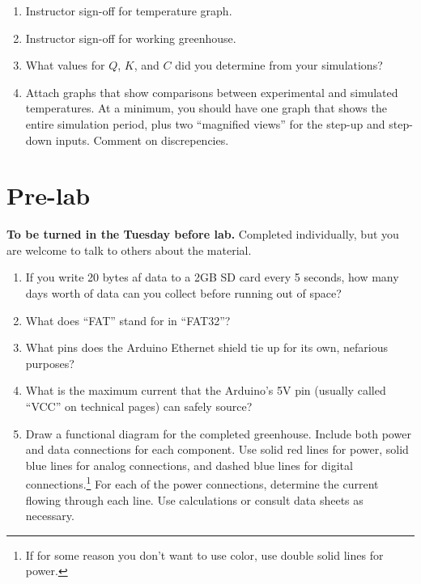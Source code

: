 \documentclass[11pt]{article} %
\begin{document}
\begin{enumerate}
\item Instructor sign-off for temperature graph.
\vspace{1in}
\item Instructor sign-off for working greenhouse.
\vspace{1in}
\item What values for $Q$, $K$, and $C$ did you determine from your simulations?
\vspace{1in}
\item Attach graphs that show comparisons between experimental and simulated temperatures. At a minimum, you should have one graph that shows the entire simulation period, plus two ``magnified views'' for the step-up and step-down inputs. Comment on discrepencies.
\vspace{1in}
\end{enumerate}

\clearpage
\pagebreak
\section{Pre-lab}
{\bf To be turned in the Tuesday before lab.} 
Completed individually, but you are welcome to talk to others about the material.
\begin{enumerate}
\item If you write 20 bytes af data to a 2GB SD card every 5 seconds, how many days worth of data can you collect before running out of space?
\vspace{1in}
\item What does ``FAT'' stand for in ``FAT32''?
\vspace{1in}
\item What pins does the Arduino Ethernet shield tie up for its own, nefarious purposes?
\vspace{1in}
\item What is the maximum current that the Arduino's 5V pin (usually called ``VCC'' on technical pages) can safely source?
\vspace{1in}
\item Draw a functional diagram for the completed greenhouse. Include both power and data connections for each component. Use solid red lines for power, solid blue lines for analog connections, and dashed blue lines for digital connections.\footnote{If for some reason you don't want to use color, use double solid lines for power.} For each of the power connections, determine the current flowing through each line. Use calculations or consult data sheets as necessary.
\end{enumerate}
\end{document}
